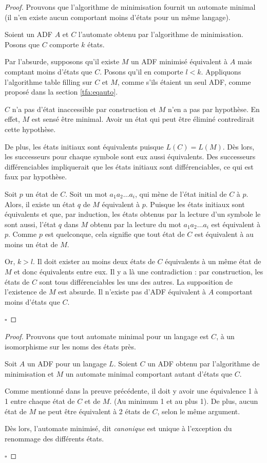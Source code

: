 \begin{proof}
 Prouvons que l'algorithme de minimisation fournit un automate minimal (il n'en existe aucun comportant moins d'états pour un même langage).

 Soient un ADF $A$ et $C$ l'automate obtenu par l'algorithme de minimisation. Posons que $C$ comporte $k$ états.

 Par l'absurde, supposons qu'il existe $M$ un ADF minimisé équivalent à $A$ mais comptant moins d'états que $C$. Posons qu'il en comporte $l<k$. Appliquons l'algorithme table filling sur $C$ et $M$, comme s'ils étaient un seul ADF, comme proposé dans la section \ref{tfa:eqauto}.

 $C$ n'a pas d'état inaccessible par construction et $M$ n'en a pas par hypothèse. En effet, $M$ est sensé être minimal. Avoir un état qui peut être éliminé contredirait cette hypothèse.

 De plus, les états initiaux sont équivalents puisque $L(C)=L(M)$. Dès lors, les successeurs pour chaque symbole sont eux aussi équivalents. Des successeurs différenciables impliquerait que les états initiaux sont différenciables, ce qui est faux par hypothèse.

 Soit $p$ un état de $C$. Soit un mot $a_1a_2\dots a_i$, qui mène de l'état initial de $C$ à $p$. Alors, il existe un état $q$ de $M$ équivalent à $p$. Puisque les états initiaux sont équivalents et que, par induction, les états obtenus par la lecture d'un symbole le sont aussi, l'état $q$ dans $M$ obtenu par la lecture du mot $a_1a_2\dots a_i$ est équivalent à $p$.
 Comme $p$ est quelconque, cela signifie que tout état de $C$ est équivalent à au moins un état de $M$.

 Or, $k>l$. Il doit exister au moins deux états de $C$ équivalents à un même état de $M$ et donc équivalents entre eux. Il y a là une contradiction : par construction, les états de $C$ sont tous différenciables les uns des autres. La supposition de l'existence de $M$ est absurde. Il n'existe pas d'ADF équivalent à $A$ comportant moins d'états que $C$.

 \hfill$\square$
\end{proof}

\begin{proof}
 Prouvons que tout automate minimal pour un langage est $C$, à un isomorphisme sur les noms des états près.

 Soit $A$ un ADF pour un langage $L$. Soient $C$ un ADF obtenu par l'algorithme de minimisation et $M$ un automate minimal comportant autant d'états que $C$.

 Comme mentionné dans la preuve précédente, il doit y avoir une équivalence 1 à 1 entre chaque état de $C$ et de $M$. (Au minimum 1 et au plus 1). De plus, aucun état de $M$ ne peut être équivalent à 2 états de $C$, selon le même argument.

 Dès lors, l'automate minimisé, dit \emph{canonique} est unique à l'exception du renommage des différents états.

 \hfill$\square$
\end{proof}
